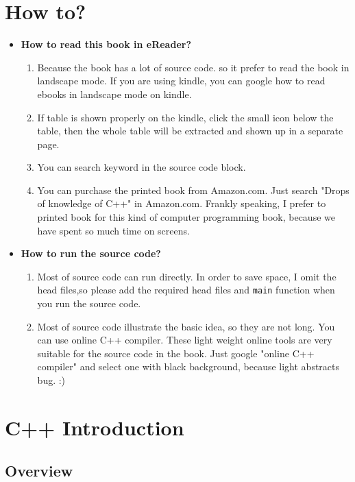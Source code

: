 \documentclass[a4paper,11pt,twoside]{book}
\begin{document}
\chapter*{How to?}
\begin{itemize}
	\item \textbf{How to read this book in eReader?}
	\begin{enumerate}
		\item Because the book has a lot of source code. so it prefer to read the book in landscape mode. If you are using kindle, you can google how to read ebooks in landscape mode on kindle. 
		
		\item If table is shown properly on the kindle, click the small icon below the table, then the whole table will be extracted and shown up in a separate page. 
		
		\item You can search keyword in the source code block.
		
		\item You can purchase the printed book from Amazon.com. Just search "Drops of knowledge of C++" in Amazon.com. Frankly speaking, I prefer to printed book for this kind of computer programming book, because we have spent so much time on screens.
	\end{enumerate}

	\item \textbf{How to run the source code?}
	\begin{enumerate}
		\item Most of source code can run directly. In order to save space, I omit the head files,so please add the required head files and \texttt{main} function when you run the source code.
		
		\item Most of source code illustrate the basic idea, so they are not long. You can use online C++ compiler. These light weight online tools are very suitable for the source code in the book. Just google "online C++ compiler" and select one with black background, because light abstracts bug. :)
	\end{enumerate}

\end{itemize}

\chapter{C++ Introduction}
\section{Overview}
\end{document}
